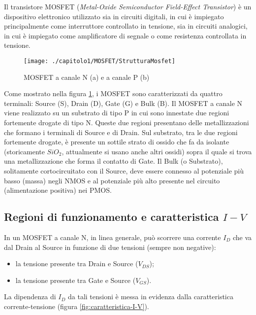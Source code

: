 Il transistore MOSFET (\emph{Metal-Oxide Semiconductor Field-Effect Transistor}) è un dispositivo elettronico utilizzato sia in circuiti digitali, in cui è impiegato principalmente come interruttore controllato in tensione, sia in circuiti analogici, in cui è impiegato come amplificatore di segnale o come resistenza controllata in tensione.\\

\begin{figure}[H]
  \centering
  \texttt{[image: ./capitolo1/MOSFET/StrutturaMosfet]}
  \caption[Struttura dei MOSFET]{MOSFET a canale N (a) e a canale P (b) \cite{transistore_MOSFET:From_MOSFET_to_FinFET_to_GAAFET}}
  \label{fig:StrutturaMosfet}
\end{figure}

Come mostrato nella figura \ref{fig:StrutturaMosfet}, i MOSFET sono caratterizzati da quattro terminali: Source (S), Drain (D), Gate (G) e Bulk (B).
Il MOSFET a canale N viene realizzato su un substrato di tipo P in cui sono innestate due regioni fortemente drogate di tipo N. Queste due regioni presentano delle metallizzazioni che formano i terminali di Source e di Drain. Sul substrato, tra le due regioni fortemente drogate, è presente un sottile strato di ossido che fa da isolante (storicamente $SiO_2$, attualmente si usano anche altri ossidi) sopra il quale si trova una metallizzazione che forma il contatto di Gate. Il Bulk (o Substrato), solitamente cortocircuitato con il Source, deve essere connesso al potenziale più basso (massa) negli NMOS e al potenziale più alto presente nel circuito (alimentazione positiva) nei PMOS. \\

\subsection{Regioni di funzionamento e caratteristica $I-V$}


In un MOSFET a canale N, in linea generale, può scorrere una corrente $I_D$ che va dal Drain al Source in funzione di due tensioni (sempre non negative): 
\begin{itemize}
  \item la tensione presente tra Drain e Source ($V_{DS}$);
  \item la tensione presente tra Gate e Source ($V_{GS}$).  
\end{itemize}

La dipendenza di $I_D$ da tali tensioni è messa in evidenza dalla caratteristica corrente-tensione (figura \ref{fig:caratteristica-I-V}).

